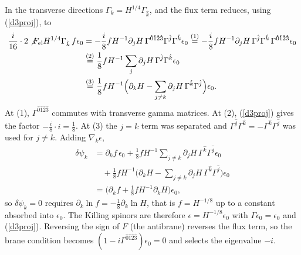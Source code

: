 \begin{tcolorbox}[breakable]
\begin{remark}
In the transverse directions $\Gamma_k = H^{1/4}\Gamma_{\hat k}$, and the flux term reduces, using (\ref{d3proj}), to
\begin{align*}
\frac{i}{16}\cdot2\not{F}_{\rm el}H^{1/4}\Gamma_{\hat k}\,f\epsilon_0
&= -\frac{i}{8}fH^{-1}\partial_jH\,\Gamma^{\hat0\hat1\hat2\hat3}\Gamma^{\hat j}\Gamma^{\hat k}\epsilon_0
\overset{(1)}{=} -\frac{i}{8}fH^{-1}\partial_jH\,\Gamma^{\hat j}\Gamma^{\hat k}\,\Gamma^{\hat0\hat1\hat2\hat3}\epsilon_0 \\
&\overset{(2)}{=} \frac18fH^{-1}\sum_j\partial_jH\,\Gamma^{\hat j}\Gamma^{\hat k}\epsilon_0 \\
&\overset{(3)}{=} \frac18fH^{-1}\Big(\partial_kH - \sum_{j\ne k}\partial_jH\,\Gamma^{\hat k}\Gamma^{\hat j}\Big)\epsilon_0 .
\end{align*}
At (1), $\Gamma^{\hat0\hat1\hat2\hat3}$ commutes with transverse gamma matrices. At (2), (\ref{d3proj}) gives the factor $-\frac{i}{8}\cdot i = \frac18$. At (3) the $j=k$ term was separated and $\Gamma^{\hat j}\Gamma^{\hat k} = -\Gamma^{\hat k}\Gamma^{\hat j}$ was used for $j\ne k$. Adding $\nabla_k\epsilon$,
\begin{align*}
\delta\psi_k &= \partial_kf\,\epsilon_0 + \frac18fH^{-1}\sum_{j\ne k}\partial_jH\,\Gamma^{\hat k}\Gamma^{\hat j}\epsilon_0 \\
&\quad + \frac18fH^{-1}\Big(\partial_kH - \sum_{j\ne k}\partial_jH\,\Gamma^{\hat k}\Gamma^{\hat j}\Big)\epsilon_0 \\
&= \Big(\partial_kf + \frac18fH^{-1}\partial_kH\Big)\epsilon_0 ,
\end{align*}
so $\delta\psi_k = 0$ requires $\partial_k\ln f = -\frac18\partial_k\ln H$, that is $f = H^{-1/8}$ up to a constant absorbed into $\epsilon_0$. The Killing spinors are therefore $\epsilon = H^{-1/8}\epsilon_0$ with $\Gamma\epsilon_0 = \epsilon_0$ and (\ref{d3proj}). Reversing the sign of $F$ (the antibrane) reverses the flux term, so the brane condition becomes $(1 - i\Gamma^{\hat0\hat1\hat2\hat3})\epsilon_0 = 0$ and selects the eigenvalue $-i$.


\end{remark}
\end{tcolorbox}
